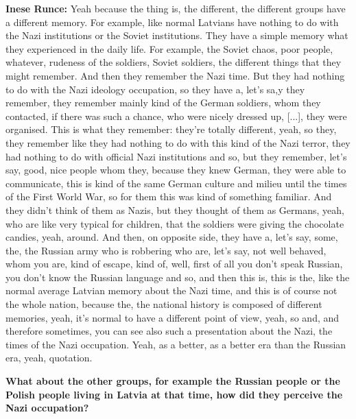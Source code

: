 \textbf{Inese Runce:} Yeah because the thing is, the different, the different groups have a different memory. For example, like normal Latvians have nothing to do with the Nazi institutions or the Soviet institutions. They have a simple memory what they experienced in the daily life.  For example, the Soviet chaos, poor people, whatever, rudeness of the soldiers, Soviet soldiers, the different things that they might remember. And then they remember the Nazi time. But they had nothing to do with the Nazi ideology occupation, so they have a, let's sa,y they remember, they remember mainly kind of the German soldiers, whom they contacted, if there was such a  chance, who were nicely  dressed up, [...],  they were organised. This is what they remember: they're totally different, yeah, so they, they remember like they had nothing to do with this kind of the Nazi terror, they had nothing to do with official Nazi institutions and so, but they remember, let's say, good, nice people whom they, because they knew German, they were able to communicate, this is kind of the same German culture and milieu until the times of the First World War, so for them this was kind of something familiar. And they didn't think of them as Nazis, but they thought of them as Germans,  yeah, who are like very typical for children, that the soldiers were giving the chocolate  candies, yeah, around. And then, on opposite side, they have a, let's say, some, the, the Russian army who is robbering who are, let's say, not well behaved, whom you are, kind of escape, kind of, well, first of all you don't speak Russian, you don't know the Russian language and so, and then this is, this is the, like the normal average Latvian memory about the Nazi time, and this is of course not the whole nation, because the, the national history is composed of different memories, yeah, it’s normal to have a different point of view, yeah, so and, and therefore sometimes, you can see also such a presentation about the Nazi, the times of the Nazi occupation. Yeah, as a better, as a better era than the Russian era, yeah, quotation.
 
\textbf{What about the other groups, for example the Russian people or the Polish people living in Latvia at that time, how did they perceive the Nazi occupation?}

